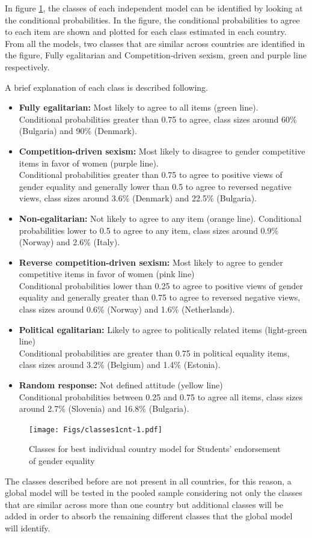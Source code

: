 \documentclass[12pt,a4paper,oneside]{reedthesis}
\begin{document}
In figure \ref{fig:classes1cnt}, the classes of each independent model can be identified by looking at the conditional probabilities. In the figure, the conditional probabilities to agree to each item are shown and plotted for each class estimated in each country. From all the models, two classes that are similar across countries are identified in the figure, Fully egalitarian and Competition-driven sexism, green and purple line respectively.

A brief explanation of each class is described following.
\begin{itemize}
\item
  \textbf{Fully egalitarian:} Most likely to agree to all items (green line).\\
  Conditional probabilities greater than 0.75 to agree, class sizes around 60\% (Bulgaria) and 90\% (Denmark).
\item
  \textbf{Competition-driven sexism:} Most likely to disagree to gender competitive items in favor of women (purple line).\\
  Conditional probabilities greater than 0.75 to agree to positive views of gender equality and generally lower than 0.5 to agree to reversed negative views, class sizes around 3.6\% (Denmark) and 22.5\% (Bulgaria).
\item
  \textbf{Non-egalitarian:} Not likely to agree to any item (orange line).
  Conditional probabilities lower to 0.5 to agree to any item, class sizes around 0.9\% (Norway) and 2.6\% (Italy).
\item
  \textbf{Reverse competition-driven sexism:} Most likely to agree to gender competitive items in favor of women (pink line)\\
  Conditional probabilities lower than 0.25 to agree to positive views of gender equality and generally greater than 0.75 to agree to reversed negative views, class sizes around 0.6\% (Norway) and 1.6\% (Netherlands).
\item
  \textbf{Political egalitarian:} Likely to agree to politically related items (light-green line)\\
  Conditional probabilities are greater than 0.75 in political equality items, class sizes around 3.2\% (Belgium) and 1.4\% (Estonia).
\item
  \textbf{Random response:} Not defined attitude (yellow line)\\
  Conditional probabilities between 0.25 and 0.75 to agree all items, class sizes around 2.7\% (Slovenia) and 16.8\% (Bulgaria).
\end{itemize}
\begin{figure}
\centering
\texttt{[image: Figs/classes1cnt-1.pdf]}
\caption{\label{fig:classes1cnt}Classes for best individual country model for Students' endorsement of gender equality}
\end{figure}
The classes described before are not present in all countries, for this reason, a global model will be tested in the pooled sample considering not only the classes that are similar across more than one country but additional classes will be added in order to absorb the remaining different classes that the global model will identify.
\end{document}
